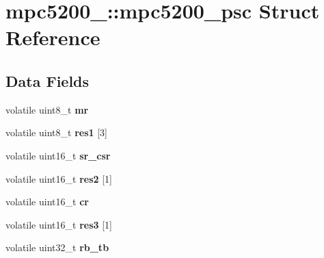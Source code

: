 \hypertarget{structmpc5200___1_1mpc5200__psc}{}\section{mpc5200\+\_\+\+::mpc5200\+\_\+psc Struct Reference}
\label{structmpc5200___1_1mpc5200__psc}
\subsection*{Data Fields}
\begin{DoxyCompactItemize}
\item 
\mbox{\label{structmpc5200___1_1mpc5200__psc_acb3031355b2be5f4326911686d33e1fe}} 
volatile uint8\+\_\+t {\bfseries mr}
\item 
\mbox{\label{structmpc5200___1_1mpc5200__psc_a2cd79ce4354b55f80e8ceaea77095efb}} 
volatile uint8\+\_\+t {\bfseries res1} \mbox{[}3\mbox{]}
\item 
\mbox{\label{structmpc5200___1_1mpc5200__psc_ab555b7ed79f3906448ce568de67ce3b1}} 
volatile uint16\+\_\+t {\bfseries sr\+\_\+csr}
\item 
\mbox{\label{structmpc5200___1_1mpc5200__psc_a8d69b463cd555fd3b57314bcbb9d3b38}} 
volatile uint16\+\_\+t {\bfseries res2} \mbox{[}1\mbox{]}
\item 
\mbox{\label{structmpc5200___1_1mpc5200__psc_a2e5118aa5a0080d5db27ea8a276ee840}} 
volatile uint16\+\_\+t {\bfseries cr}
\item 
\mbox{\label{structmpc5200___1_1mpc5200__psc_aba8ee65608566e6a07f37ca1aa2f11b5}} 
volatile uint16\+\_\+t {\bfseries res3} \mbox{[}1\mbox{]}
\item 
\mbox{\label{structmpc5200___1_1mpc5200__psc_a1808cda7a0b65e523df89777575484fe}} 
volatile uint32\+\_\+t {\bfseries rb\+\_\+tb}
\item 
\mbox{\label{structmpc5200___1_1mpc5200__psc_ac2f26fd86993a78c177609aaaa4efb6b}} 

\end{DoxyCompactItemize}
